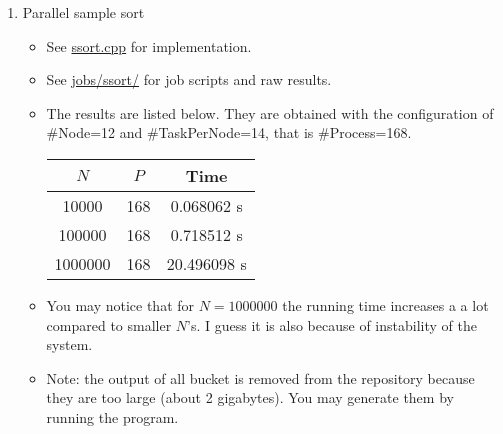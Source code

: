 \documentclass{article}
\begin{document}
\begin{enumerate}
  \item Parallel sample sort
  \begin{itemize}
    \item See \url{ssort.cpp} for implementation.
    \item See \url{jobs/ssort/} for job scripts and raw results.
    \item The results are listed below. They are obtained with the
    configuration of \#Node=12 and \#TaskPerNode=14, that is \#Process=168.
    \begin{center}
      \begin{tabular}{ccc}
        \toprule
        $N$ & $P$ & Time \\
        \midrule
        10000   & 168 & 0.068062  s \\
        100000  & 168 & 0.718512  s \\
        1000000 & 168 & 20.496098 s \\
        \bottomrule
      \end{tabular}
    \end{center}
    \item You may notice that for $N=1000000$ the running time increases a
    a lot compared to smaller $N$'s. I guess it is also because of instability
    of the system.
    \item Note: the output of all bucket is removed from the repository
    because they are too large (about 2 gigabytes). You may generate them by
    running the program.
  \end{itemize}
\end{enumerate}
\end{document}
